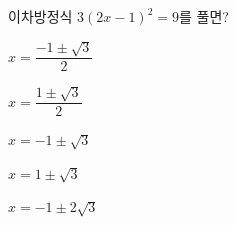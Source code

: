 이차방정식 $3(2x-1)^2=9$를 풀면?
\begin{choicesii}{\rule[-3ex]{0pt}{8ex}$x=\dfrac{-1\pm\sqrt{3}}{2}$}{\rule[-3ex]{0pt}{8ex}$x=\dfrac{1\pm\sqrt{3}}{2}$}{\rule[-3ex]{0pt}{8ex}$x=-1\pm\sqrt{3}$}{\rule[-3ex]{0pt}{8ex}$x=1\pm\sqrt{3}$}{\rule[-3ex]{0pt}{8ex}$x=-1\pm2\sqrt{3}$}\end{choicesii}
